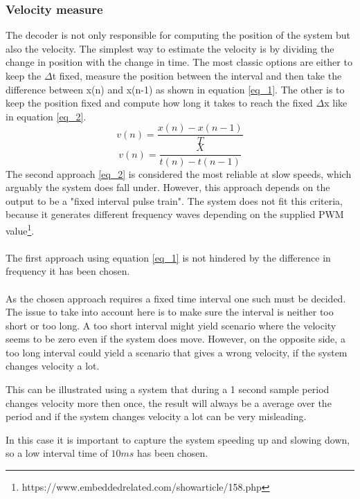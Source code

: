 \documentclass[../../../main]{subfiles}
\begin{document}
\subsubsection{Velocity measure}
The decoder is not only responsible for computing the position of the system but also the velocity. The simplest way to estimate the velocity is by dividing the change in position with the change in time. The most classic options are either to keep the $\Delta$t fixed, measure the position between the interval and then take the difference between x(n) and x(n-1) as shown in equation \ref{eq_1}. The other is to keep the position fixed and compute how long it takes to reach the fixed  $\Delta$x like in equation \ref{eq_2}.
\begin{equation}
v(n) = \frac{x(n)-x(n-1)}{T}
\label{eq_1}
\end{equation}
\begin{equation}
  v(n) = \frac{X}{t(n)-t(n-1)}
  \label{eq_2}
\end{equation}
The second approach \ref{eq_2} is considered the most reliable at slow speeds, which arguably the system does fall under. However, this approach depends on the output to be a "fixed interval pulse train". The system does not fit this criteria, because it generates different frequency waves depending on the supplied PWM value\footnote{https://www.embeddedrelated.com/showarticle/158.php}.\\
\\
The first approach using equation \ref{eq_1} is not hindered by the difference in frequency it has been chosen.  \\
\\
 As the chosen approach requires a fixed time interval one such must be decided. The issue to take into account here is to make sure the interval is neither too short or too long. A too short interval might yield scenario where the velocity seems to be zero even if the system does move. However, on the opposite side, a too long interval could yield a scenario that gives a wrong velocity, if the system changes velocity a lot.

This can be illustrated using a system that during a 1 second sample period changes velocity more then once, the result will always be a average over the period and if the system changes velocity a lot can be very misleading.

In this case it is important to capture the system speeding up and slowing down, so a low interval time of $10ms$ has been chosen.
\end{document}
